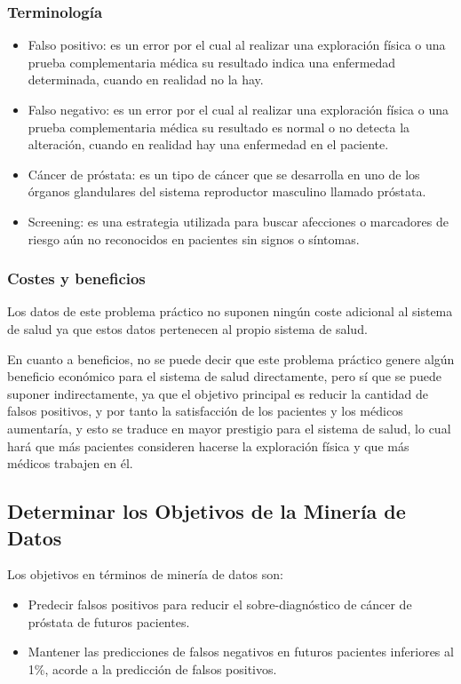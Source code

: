 \documentclass{article}
\begin{document}
\subsubsection{Terminología}

\begin{itemize}
	\item Falso positivo: es un error por el cual al realizar una exploración física o una prueba complementaria médica su resultado indica una enfermedad determinada, cuando en realidad no la hay.
	\item Falso negativo: es un error por el cual al realizar una exploración física o una prueba complementaria médica su resultado es normal o no detecta la alteración, cuando en realidad hay una enfermedad en el paciente.
	\item Cáncer de próstata: es un tipo de cáncer que se desarrolla en uno de los órganos glandulares del sistema reproductor masculino llamado próstata.
	\item Screening: es una estrategia utilizada para buscar afecciones o marcadores de riesgo aún no reconocidos en pacientes sin signos o síntomas.
\end{itemize}

\subsubsection{Costes y beneficios}
Los datos de este problema práctico no suponen ningún coste adicional al sistema de salud ya que estos datos pertenecen al propio sistema de salud.

En cuanto a beneficios, no se puede decir que este problema práctico genere algún beneficio económico para el sistema de salud directamente, pero sí que se puede suponer indirectamente, ya que el objetivo principal es reducir la cantidad de falsos positivos, y por tanto la satisfacción de los pacientes y los médicos aumentaría, y esto se traduce en mayor prestigio para el sistema de salud, lo cual hará que más pacientes consideren hacerse la exploración física y que más médicos trabajen en él.

\subsection{Determinar los Objetivos de la Minería de Datos}\label{Objetivos de la Minería de Datos}
Los objetivos en términos de minería de datos son:

\begin{itemize}
	\item Predecir falsos positivos para reducir el sobre-diagnóstico de cáncer de próstata de futuros pacientes.
	\item Mantener las predicciones de falsos negativos en futuros pacientes inferiores al 1\%, acorde a la predicción de falsos positivos.
\end{itemize}
\end{document}
